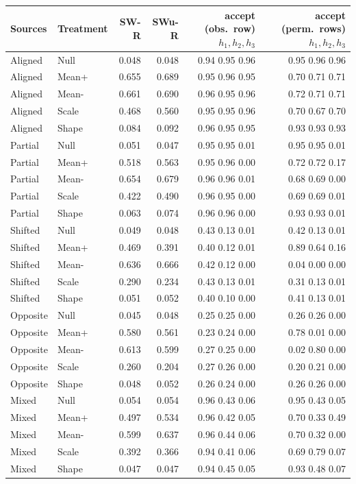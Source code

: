 \begin{tabular}{@{}llrrrr@{}}
\toprule
Sources & Treatment & SW-R & SWu-R & accept (obs.\ row) $h_1,h_2,h_3$ & accept (perm.\ rows) $h_1,h_2,h_3$\\
\midrule
Aligned & Null & 0.048 & 0.048 & 0.94 0.95 0.96 & 0.95 0.96 0.96\\
Aligned & Mean+ & 0.655 & 0.689 & 0.95 0.96 0.95 & 0.70 0.71 0.71\\
Aligned & Mean- & 0.661 & 0.690 & 0.96 0.95 0.96 & 0.72 0.71 0.71\\
Aligned & Scale & 0.468 & 0.560 & 0.95 0.95 0.96 & 0.70 0.67 0.70\\
Aligned & Shape & 0.084 & 0.092 & 0.96 0.95 0.95 & 0.93 0.93 0.93\\
\addlinespace[2pt]
Partial & Null & 0.051 & 0.047 & 0.95 0.95 0.01 & 0.95 0.95 0.01\\
Partial & Mean+ & 0.518 & 0.563 & 0.95 0.96 0.00 & 0.72 0.72 0.17\\
Partial & Mean- & 0.654 & 0.679 & 0.96 0.96 0.01 & 0.68 0.69 0.00\\
Partial & Scale & 0.422 & 0.490 & 0.96 0.95 0.00 & 0.69 0.69 0.01\\
Partial & Shape & 0.063 & 0.074 & 0.96 0.96 0.00 & 0.93 0.93 0.01\\
\addlinespace[2pt]
Shifted & Null & 0.049 & 0.048 & 0.43 0.13 0.01 & 0.42 0.13 0.01\\
Shifted & Mean+ & 0.469 & 0.391 & 0.40 0.12 0.01 & 0.89 0.64 0.16\\
Shifted & Mean- & 0.636 & 0.666 & 0.42 0.12 0.00 & 0.04 0.00 0.00\\
Shifted & Scale & 0.290 & 0.234 & 0.43 0.13 0.01 & 0.31 0.13 0.01\\
Shifted & Shape & 0.051 & 0.052 & 0.40 0.10 0.00 & 0.41 0.13 0.01\\
\addlinespace[2pt]
Opposite & Null & 0.045 & 0.048 & 0.25 0.25 0.00 & 0.26 0.26 0.00\\
Opposite & Mean+ & 0.580 & 0.561 & 0.23 0.24 0.00 & 0.78 0.01 0.00\\
Opposite & Mean- & 0.613 & 0.599 & 0.27 0.25 0.00 & 0.02 0.80 0.00\\
Opposite & Scale & 0.260 & 0.204 & 0.27 0.26 0.00 & 0.20 0.21 0.00\\
Opposite & Shape & 0.048 & 0.052 & 0.26 0.24 0.00 & 0.26 0.26 0.00\\
\addlinespace[2pt]
Mixed & Null & 0.054 & 0.054 & 0.96 0.43 0.06 & 0.95 0.43 0.05\\
Mixed & Mean+ & 0.497 & 0.534 & 0.96 0.42 0.05 & 0.70 0.33 0.49\\
Mixed & Mean- & 0.599 & 0.637 & 0.96 0.44 0.06 & 0.70 0.32 0.00\\
Mixed & Scale & 0.392 & 0.366 & 0.94 0.41 0.06 & 0.69 0.79 0.07\\
Mixed & Shape & 0.047 & 0.047 & 0.94 0.45 0.05 & 0.93 0.48 0.07\\
\bottomrule
\end{tabular}